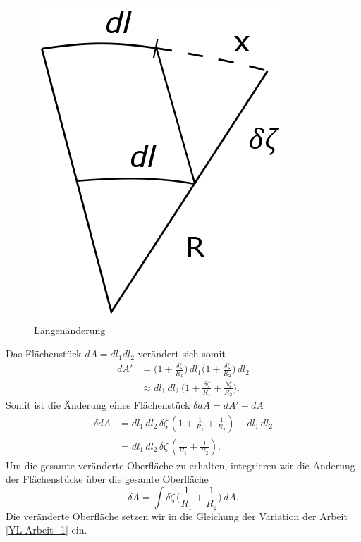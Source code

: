 \begin{refsection}
\begin{figure}
  \centering
  \includegraphics[scale=0.3]{minimal/Langenanderung2.png}
  \caption{Längenänderung} 
  \label{fig:Strahlensatz}
\end{figure}
Das Flächenstück $dA=dl_1 dl_2$ verändert sich somit
\begin{equation}
\begin{split}
dA' &= \bigg(1+\frac{\delta\zeta}{R_1}\bigg)\, dl_1 \bigg(1+\frac{\delta\zeta}{R_2}\bigg) \, dl_2 \\
&\approx dl_1\,dl_2\,\bigg(1+\frac{\delta\zeta}{R_1} + \frac{\delta\zeta}{R_2}\bigg).
\end{split}
\end{equation} 
Somit ist die Änderung eines Flächenstück $\delta dA=dA'-dA$
\begin{equation}
\begin{split}
\delta dA &= dl_1\,dl_2\,\delta\zeta\,(1+\frac{1}{R_1}+\frac{1}{R_2})-dl_1\,dl_2\\
&= dl_1\,dl_2\,\delta\zeta\,(\frac{1}{R_1}+\frac{1}{R_2}).
\end{split}
\end{equation}
Um die gesamte veränderte Oberfläche zu erhalten, integrieren wir die Änderung der Flächenstücke über die gesamte Oberfläche
\begin{equation}
\delta A = \int \delta\zeta \, \bigg( \frac{1}{R_1}+\frac{1}{R_2} \bigg)\,dA.
\end{equation}
Die veränderte Oberfläche setzen wir in die Gleichung der Variation der Arbeit \eqref{YL-Arbeit_1} ein. 

\end{refsection}
